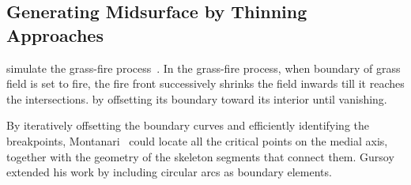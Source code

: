 	

\subsection{Generating Midsurface by Thinning Approaches}

 simulate the grass-fire process~\cite{Harry1967}. In the grass-fire process, when boundary of grass field is set to fire, the fire front successively shrinks the field inwards till it reaches the intersections.  by offsetting its boundary toward its interior until vanishing. %

By iteratively offsetting the boundary curves and efficiently identifying the breakpoints, Montanari~\cite{Montanari1969} could locate all the critical points on the medial axis, together with the geometry of the skeleton segments that connect them. Gursoy~\cite{Gursoy1989} extended his work by including circular arcs as boundary elements.

